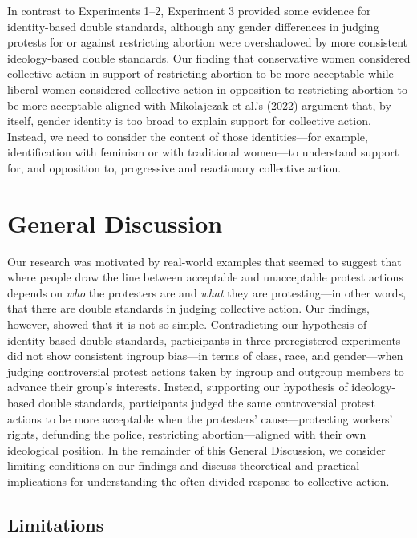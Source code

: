 \documentclass[12pt, letterpaper]{article}
\begin{document}
In contrast to Experiments 1--2, Experiment 3 provided some evidence for
identity-based double standards, although any gender differences in
judging protests for or against restricting abortion were overshadowed
by more consistent ideology-based double standards. Our finding that
conservative women considered collective action in support of
restricting abortion to be more acceptable while liberal women
considered collective action in opposition to restricting abortion to be
more acceptable aligned with Mikolajczak et al.'s (2022) argument that,
by itself, gender identity is too broad to explain support for
collective action. Instead, we need to consider the content of those
identities---for example, identification with feminism or with
traditional women---to understand support for, and opposition to,
progressive and reactionary collective action.

\hypertarget{general-discussion}{%
\section{General Discussion}\label{general-discussion}}

Our research was motivated by real-world examples that seemed to suggest
that where people draw the line between acceptable and unacceptable
protest actions depends on \emph{who} the protesters are and \emph{what}
they are protesting---in other words, that there are double standards in
judging collective action. Our findings, however, showed that it is not
so simple. Contradicting our hypothesis of identity-based double
standards, participants in three preregistered experiments did not show
consistent ingroup bias---in terms of class, race, and gender---when
judging controversial protest actions taken by ingroup and outgroup
members to advance their group's interests. Instead, supporting our
hypothesis of ideology-based double standards, participants judged the
same controversial protest actions to be more acceptable when the
protesters' cause---protecting workers' rights, defunding the police,
restricting abortion---aligned with their own ideological position. In
the remainder of this General Discussion, we consider limiting
conditions on our findings and discuss theoretical and practical
implications for understanding the often divided response to collective
action.

\hypertarget{limitations}{%
\subsection{Limitations}\label{limitations}}
\end{document}
